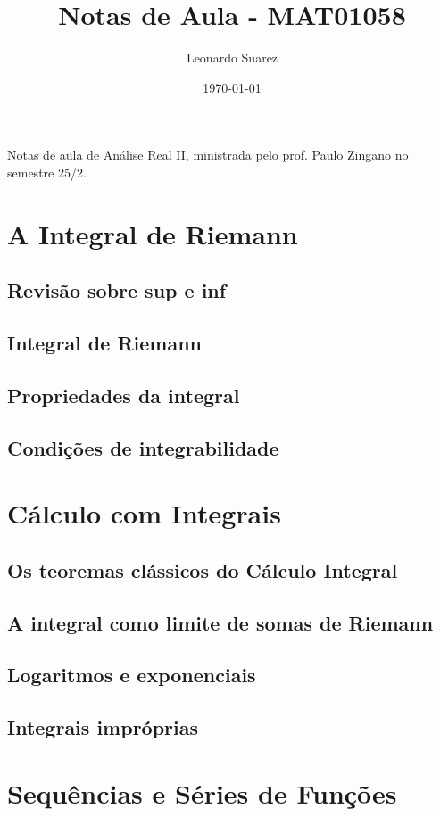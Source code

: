 \documentclass{article}
\title{Notas de Aula - MAT01058}
\author{Leonardo Suarez}
\date{\today}
\begin{document}
\maketitle

Notas de aula de Análise Real II, ministrada pelo prof. Paulo Zingano no semestre 25/2.

\tableofcontents

\section{A Integral de Riemann}
\subsection{Revisão sobre sup e inf}
\subsection{Integral de Riemann}
\subsection{Propriedades da integral}
\subsection{Condições de integrabilidade}

\section{Cálculo com Integrais}
\subsection{Os teoremas clássicos do Cálculo Integral}
\subsection{A integral como limite de somas de Riemann}
\subsection{Logaritmos e exponenciais}
\subsection{Integrais impróprias}

\section{Sequências e Séries de Funções}
\end{document}
